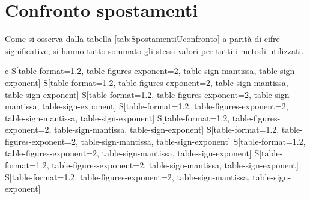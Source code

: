 \section{Confronto spostamenti}\label{cap:cap4}
Come si osserva dalla tabella \ref{tab:SpostamentiUconfronto} a parità di cifre significative, si hanno tutto sommato gli stessi valori per tutti i metodi utilizzati.
\begin{landscape}


\vspace{3cm}
\begin{table}[htb]
    \footnotesize
    \centering
    \caption[Confronto dei risultati degli spostamenti tra i tre diversi metodi utilizzati]{Confronto dei risultati degli spostamenti tra i tre diversi metodi utilizzati. I valori solo da considerarsi riferiti al sistema di riferimento proprio di ciascun metodo}
    \label{tab:SpostamentiUconfronto}
    \begin{tabular}{c
                    S[table-format=1.2,
                      table-figures-exponent=2,
                      table-sign-mantissa,
                      table-sign-exponent]    
                    S[table-format=1.2,
                      table-figures-exponent=2,
                      table-sign-mantissa,
                      table-sign-exponent]
                    S[table-format=1.2,
                      table-figures-exponent=2,
                      table-sign-mantissa,
                      table-sign-exponent]
                      S[table-format=1.2,
                      table-figures-exponent=2,
                      table-sign-mantissa,
                      table-sign-exponent]    
                    S[table-format=1.2,
                      table-figures-exponent=2,
                      table-sign-mantissa,
                      table-sign-exponent]
                    S[table-format=1.2,
                      table-figures-exponent=2,
                      table-sign-mantissa,
                      table-sign-exponent]
                      S[table-format=1.2,
                      table-figures-exponent=2,
                      table-sign-mantissa,
                      table-sign-exponent]    
                    S[table-format=1.2,
                      table-figures-exponent=2,
                      table-sign-mantissa,
                      table-sign-exponent]
                    S[table-format=1.2,
                      table-figures-exponent=2,
                      table-sign-mantissa,
                      table-sign-exponent]}  

\end{tabular}
\end{table}
\end{landscape}
